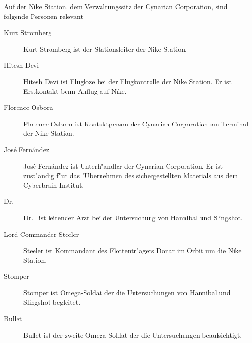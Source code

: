 
Auf der Nike Station, dem Verwaltungssitz der Cynarian Corporation, sind folgende Personen relevant:

\begin{description}
    \item [Kurt Stromberg] Kurt Stromberg ist der Stationsleiter der Nike Station.
    \item [Hitesh Devi] Hitesh Devi ist Flugloze bei der Flugkontrolle der Nike Station. Er ist Erstkontakt beim Anflug auf Nike.
    \item [Florence Osborn] Florence Osborn ist Kontaktperson der Cynarian Corporation am Terminal der Nike Station.
    \item [Jos\'e Fern\'andez] Jos\'e Fern\'andez ist Unterh"andler der Cynarian Corporation. Er ist zust"andig f"ur das "Ubernehmen des 
        sichergestellten Materials aus dem Cyberbrain Institut.
    \item [Dr.~ ] Dr.~  ist leitender Arzt bei der Untersuchung von Hannibal und 
        Slingshot.
    \item [Lord Commander Steeler] Steeler ist Kommandant des Flottentr"agers Donar im Orbit um die Nike Station.
    \item [Stomper] Stomper ist Omega-Soldat der die Untersuchungen von Hannibal und Slingshot begleitet.
    \item [Bullet] Bullet ist der zweite Omega-Soldat der die Untersuchungen beaufsichtigt.
\end{description}
